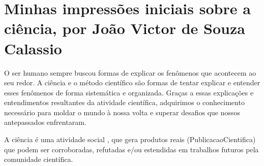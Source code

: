 \section{Minhas impressões iniciais sobre a ciência, por João Victor de Souza Calassio}

O ser humano sempre buscou formas de explicar os fenômenos que acontecem ao seu redor. A ciência e o método científico são formas de tentar explicar e entender esses fenômenos de forma sistemática e organizada. Graças a essas explicações e entendimentos resultantes da atividade científica, adquirimos o conhecimento necessário para moldar o mundo à nossa volta e superar desafios que nossos antepassados enfrentaram. 

A ciência é uma atividade social \citep{leal_ciencia_2016}, que gera produtos reais (\gls{PublicacaoCientifica}) que podem ser corroboradas, refutadas e/ou estendidas em trabalhos futuros pela comunidade científica.